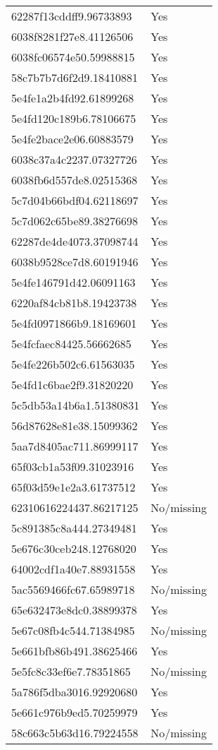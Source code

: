 \begin{tabular}{ll}
62287f13cddff9.96733893 & Yes \\
6038f8281f27e8.41126506 & Yes \\
6038fc06574e50.59988815 & Yes \\
58c7b7b7d6f2d9.18410881 & Yes \\
5e4fe1a2b4fd92.61899268 & Yes \\
5e4fd120c189b6.78106675 & Yes \\
5e4fe2bace2e06.60883579 & Yes \\
6038c37a4c2237.07327726 & Yes \\
6038fb6d557de8.02515368 & Yes \\
5c7d04b66bdf04.62118697 & Yes \\
5c7d062c65be89.38276698 & Yes \\
62287de4de4073.37098744 & Yes \\
6038b9528ce7d8.60191946 & Yes \\
5e4fe146791d42.06091163 & Yes \\
6220af84cb81b8.19423738 & Yes \\
5e4fd0971866b9.18169601 & Yes \\
5e4fcfaec84425.56662685 & Yes \\
5e4fe226b502c6.61563035 & Yes \\
5e4fd1c6bae2f9.31820220 & Yes \\
5c5db53a14b6a1.51380831 & Yes \\
56d87628e81e38.15099362 & Yes \\
5aa7d8405ac711.86999117 & Yes \\
65f03cb1a53f09.31023916 & Yes \\
65f03d59e1e2a3.61737512 & Yes \\
62310616224437.86217125 & No/missing \\
5c891385c8a444.27349481 & Yes \\
5e676c30ceb248.12768020 & Yes \\
64002cdf1a40e7.88931558 & Yes \\
5ac5569466fc67.65989718 & No/missing \\
65e632473e8dc0.38899378 & Yes \\
5e67c08fb4c544.71384985 & No/missing \\
5e661bfb86b491.38625466 & Yes \\
5e5fc8c33ef6e7.78351865 & No/missing \\
5a786f5dba3016.92920680 & Yes \\
5e661c976b9ed5.70259979 & Yes \\
58c663c5b63d16.79224558 & No/missing \\

\end{tabular}
